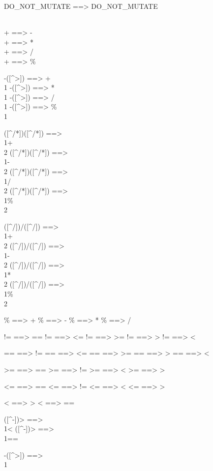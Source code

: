 \begin{figure}
{\scriptsize
\begin{code}
DO\_NOT\_MUTATE ==> DO\_NOT\_MUTATE

\\+ ==> -
\\+ ==> *
\\+ ==> /
\\+ ==> \%

-([^>]) ==> +\\1
-([^>]) ==> *\\1
-([^>]) ==> /\\1
-([^>]) ==> \%\\1

([^/*])\*([^/*]) ==> \\1+\\2
([^/*])\*([^/*]) ==> \\1-\\2
([^/*])\*([^/*]) ==> \\1/\\2
([^/*])\*([^/*]) ==> \\1\%\\2

([^\*/])/([^\*/]) ==> \\1+\\2
([^\*/])/([^\*/]) ==> \\1-\\2
([^\*/])/([^\*/]) ==> \\1*\\2
([^\*/])/([^\*/]) ==> \\1\%\\2

\% ==> +
\% ==> -
\% ==> *
\% ==> /

!= ==> ==
!= ==> <=
!= ==> >=
!= ==> >
!= ==> <

== ==> !=
== ==> <=
== ==> >=
== ==> >
== ==> <

>= ==> ==
>= ==> !=
>= ==> <
>= ==> >

<= ==> ==
<= ==> !=
<= ==> <
<= ==> >

< ==> >
< ==> ==

([^-])> ==> \\1<
([^-])> ==> \\1==

-([^>]) ==> \\1


\end{code}}
\end{figure}
